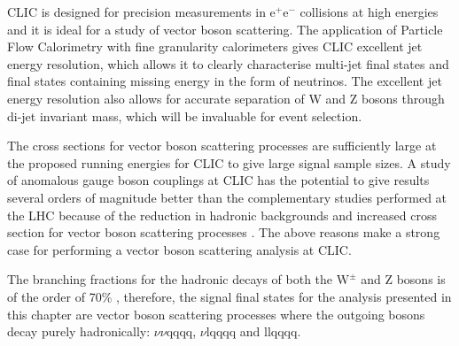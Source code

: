 CLIC is designed for precision measurements in $\text{e}^{+}\text{e}^{-}$ collisions at high energies and it is ideal for a study of vector boson scattering.  The application of Particle Flow Calorimetry with fine granularity calorimeters gives CLIC excellent jet energy resolution, which allows it to clearly characterise multi-jet final states and final states containing missing energy in the form of neutrinos.  The excellent jet energy resolution also allows for accurate separation of W and Z bosons through di-jet invariant mass, which will be invaluable for event selection.  

The cross sections for vector boson scattering processes are sufficiently large at the proposed running energies for CLIC to give large signal sample sizes.  A study of anomalous gauge boson couplings at CLIC has the potential to give results several orders of magnitude better than the complementary studies performed at the LHC because of the reduction in hadronic backgrounds and increased cross section for vector boson scattering processes \cite{Aad:2014zda}.  The above reasons make a strong case for performing a vector boson scattering analysis at CLIC.  

The branching fractions for the hadronic decays of both the $\text{W}^{\pm}$ and Z bosons is of the order of 70\% \cite{Beringer:1900zz}, therefore, the signal final states for the analysis presented in this chapter are vector boson scattering processes where the outgoing bosons decay purely hadronically: $\nu\nu\text{qqqq}$, $\nu\text{lqqqq}$ and llqqqq.  


